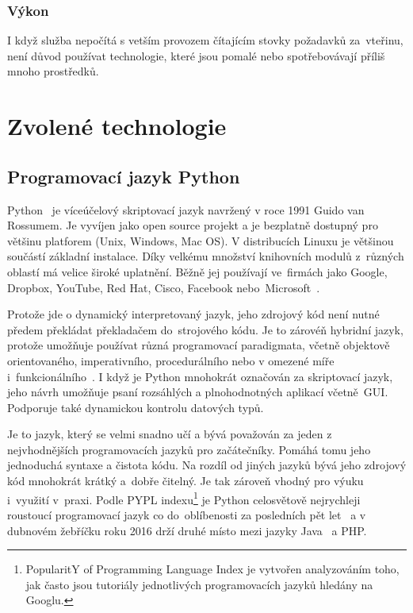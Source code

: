 \subsubsection*{Výkon}
I když služba nepočítá s vetším provozem čítajícím stovky požadavků za~vteřinu, není důvod používat technologie, které jsou pomalé
nebo spotřebovávají příliš mnoho prostředků.

\section{Zvolené technologie}

\subsection{Programovací jazyk Python}

Python~\cite{python} je víceúčelový skriptovací jazyk navržený v roce 1991 \cite{python_year} Guido van Rossumem.
Je vyvíjen jako open source projekt a je bezplatně dostupný pro většinu platforem (Unix, Windows, Mac OS).
V distribucích Linuxu je většinou součástí základní instalace. Díky velkému množství knihovních modulů z~různých oblastí
má velice široké uplatnění. Běžně jej používají ve~firmách jako Google, Dropbox, YouTube, Red Hat, Cisco,
Facebook nebo~Microsoft~\cite{python_companies}.

Protože jde o dynamický interpretovaný jazyk, jeho zdrojový kód není nutné předem překládat překladačem do~strojového kódu.
Je to zárovéň hybridní jazyk, protože umožňuje používat různá programovací paradigmata, vče\-tně objektově orientovaného,
imperativního, procedurálního nebo v omezené míře i~funkcio\-nálního~\cite{python_about}. I když je Python mnohokrát označován za skriptovací jazyk,
jeho návrh umožňuje psaní rozsáhlých a plnohodnotných aplikací včetně~GUI. Podporuje také dynamickou kontrolu datových typů.

Je to jazyk, který se velmi snadno učí a bývá považován za jeden z nejvhodnějších programovacích jazyků pro začátečníky.
Pomáhá tomu jeho jednoduchá syntaxe a čistota kódu. Na rozdíl od jiných jazyků bývá jeho zdrojový kód mnohokrát krátký a~dobře čitelný.
Je tak zároveň vhodný pro výuku i~využití v~praxi. Podle PYPL indexu\footnote{PopularitY of Programming Language Index je vytvořen analyzováním toho,
jak často jsou tutoriály jednotlivých programovacích jazyků hledány na Googlu.} je Python celosvětově nejrychleji roustoucí programovací jazyk
co do~oblíbenosti za posledních pět let~\cite{python_pypl} a v dubnovém žebříčku roku 2016 drží druhé místo mezi jazyky Java~\cite{java} a PHP.

